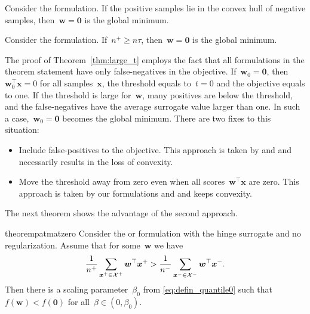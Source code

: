 \begin{corollary}\label{cor:toppush}
  Consider the \TopPush formulation. If the positive samples lie in the convex hull of negative samples, then~$\bm{w}=\bm{0}$ is the global minimum.
\end{corollary}

\begin{corollary}\label{cor:topmean}
  Consider the \TopMeanK formulation. If~$n^+\ge n\tau$, then~$\bm{w}=\bm{0}$ is the global minimum.
\end{corollary}

The proof of Theorem~\ref{thm:large_t} employs the fact that all formulations in the theorem statement have only false-negatives in the objective. If~$\bm{w}_0=\bm{0}$, then~$\bm{w}_0^\top \bm{x}=0$ for all samples~$\bm{x}$, the threshold equals to~$t=0$ and the objective equals to one. If the threshold is large for~$\bm{w}$, many positives are below the threshold, and the false-negatives have the average surrogate value larger than one. In such a case,~$\bm{w}_0=\bm{0}$ becomes the global minimum. There are two fixes to this situation:
\begin{itemize}
  \item Include false-positives to the objective. This approach is taken by \Grill and \GrillNP and necessarily results in the loss of convexity.  \item Move the threshold away from zero even when all scores~$\bm{w}^\top \bm{x}$ are zero. This approach is taken by our formulations \PatMat and \PatMatNP and keeps convexity.
\end{itemize}
The next theorem shows the advantage of the second approach.

\begin{restatable}{theorem}{patmatzero}\label{thm:patmat_zero}
  Consider the \PatMat or \PatMatNP formulation with the hinge surrogate and no regularization. Assume that for some~$\bm{w}$ we have
  \begin{equation}\label{eq:patmat_zero}
    \frac{1}{n^+}\sum_{\bm{x}^+ \in \mathcal{X}^+}\bm{w}^\top \bm{x}^+ > \frac{1}{n^-}\sum_{\bm{x}^- \in \mathcal{X}^-}\bm{w}^\top \bm{x}^-.
  \end{equation}
  Then there is a scaling parameter~$\beta_0$ from \eqref{eq:defin_quantile0} such that~$f(\bm{w})<f(\bm{0})$ for all~$\beta\in(0,\beta_0)$.
\end{restatable}

